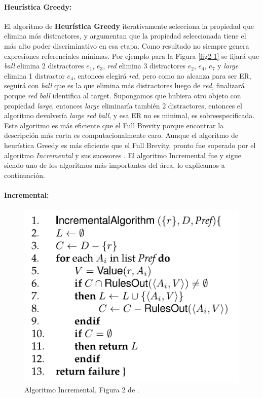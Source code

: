 \paragraph{Heur\'istica Greedy:} El algoritmo de {\bf Heur\'istica Greedy} \cite{greedy} iterativamente selecciona la propiedad que elimina m\'as distractores, y argumentan que la propiedad seleccionada tiene el m\'as alto poder discriminativo en esa etapa. Como resultado 
no siempre genera expresiones referenciales m\'inimas. Por ejemplo para la Figura \ref{fig2-1} se fijar\'a que {\it ball} elimina 2 distractores {$e_{1}$, $e_{3}$}, 
{\it red} elimina 3 distractores {$e_{2}$, $e_{4}$, $e_{7}$} y {\it large} elimina 1 distractor {$e_{4}$}, entonces elegir\'a {\it red}, 
pero como no alcanza para ser ER, seguir\'a con {\it ball} que es la que elimina m\'as distractores luego de {\it red}, finalizar\'a porque 
{\it red ball} identifica al target. Supongamos que hubiera otro objeto con propiedad {\it large}, entonces {\it large} eliminar\'ia tambi\'en  
 2 distractores, entonces el algoritmo devolver\'ia {\it large red ball}, y esa ER no es minimal, es sobreespecificada.
Este algoritmo es m\'as eficiente que el Full Brevity porque encontrar la descripci\'on m\'as corta es computacionalmente caro. Aunque el 
algoritmo de heur\'istica Greedy es m\'as eficiente que el Full Brevity, pronto fue superado por el algoritmo {\it Incremental} 
y sus sucesores \cite{C92-1038,incremental}. El algoritmo Incremental fue y sigue siendo uno de los algoritmos 
m\'as importantes del \'area, lo explicamos a continuaci\'on. 

\paragraph{Incremental:}
\label{sec:algo_incremental}
\begin{figure}[ht]
\includegraphics[width=.5\textwidth]{images/algoritmoIncremental.png}
\caption{Algoritmo Incremental, Figura 2 de \protect\cite{survey}.}\label{algoritmoIncremental}

\end{figure}

